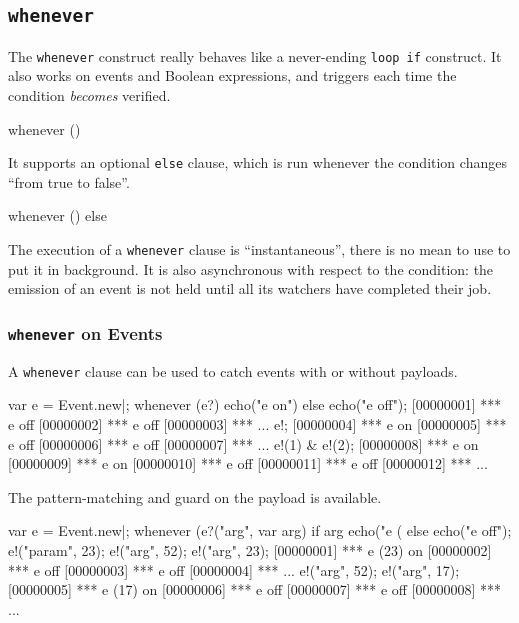 \subsection{\lstinline|whenever|}
\label{sec:lang:whenever}

The \lstinline|whenever| construct really behaves like a never-ending
\lstinline|loop if| construct.  It also works on events and Boolean
expressions, and triggers each time the condition \emph{becomes}
verified.

\begin{urbiunchecked}
whenever ()
\end{urbiunchecked}

It supports an optional \lstinline|else| clause, which is run whenever
the condition changes ``from true to false''.

\begin{urbiunchecked}
whenever ()
else
\end{urbiunchecked}

The execution of a \lstinline|whenever| clause is ``instantaneous'',
there is no mean to use \samp{,} to put it in background.  It is also
asynchronous with respect to the condition: the emission of an event
is not held until all its watchers have completed their job.

\subsubsection{\lstinline'whenever' on Events}

A \lstinline'whenever' clause can be used to catch events with or
without payloads.

\begin{urbiunchecked}[firstnumber=1]
var e = Event.new|;
whenever (e?)
  echo("e on")
else
  echo("e off");
[00000001] *** e off
[00000002] *** e off
[00000003] *** ...
e!;
[00000004] *** e on
[00000005] *** e off
[00000006] *** e off
[00000007] *** ...
e!(1) & e!(2);
[00000008] *** e on
[00000009] *** e on
[00000010] *** e off
[00000011] *** e off
[00000012] *** ...
\end{urbiunchecked}

The pattern-matching and guard on the payload is available.

\begin{urbiunchecked}[firstnumber=1]
var e = Event.new|;
whenever (e?("arg", var arg) if arg %
  echo("e (%
else
  echo("e off");
e!("param", 23);
e!("arg", 52);
e!("arg", 23);
[00000001] *** e (23) on
[00000002] *** e off
[00000003] *** e off
[00000004] *** ...
e!("arg", 52);
e!("arg", 17);
[00000005] *** e (17) on
[00000006] *** e off
[00000007] *** e off
[00000008] *** ...
\end{urbiunchecked}


